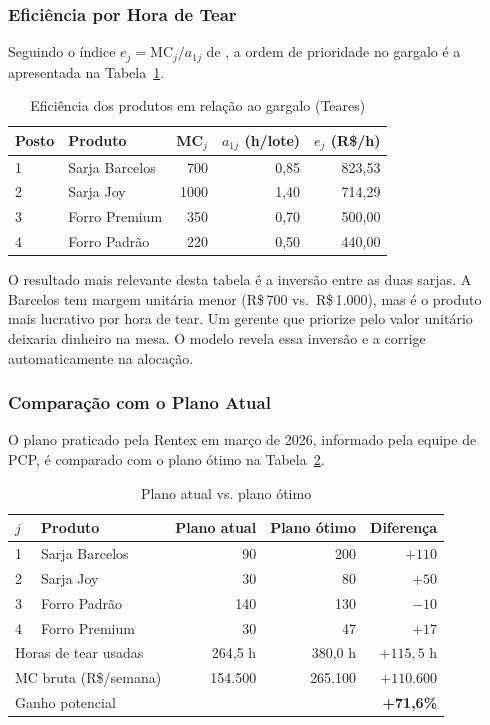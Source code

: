 \subsubsection{Eficiência por Hora de Tear}

Seguindo o índice $e_j = \mathrm{MC}_j / a_{1j}$ de \textcite{sobreiro2013},
a ordem de prioridade no gargalo é a apresentada na Tabela~\ref{tab:efic}.

\begin{table}[H]
\centering
\caption{Eficiência dos produtos em relação ao gargalo (Teares)}
\label{tab:efic}
\begin{tabular}{llrrr}
\toprule
\textbf{Posto} & \textbf{Produto} & \textbf{MC$_j$} & \textbf{$a_{1j}$ (h/lote)} & \textbf{$e_j$ (R\$/h)} \\
\midrule
1 & Sarja Barcelos  &  700 & 0,85 & 823,53 \\
2 & Sarja Joy       & 1000 & 1,40 & 714,29 \\
3 & Forro Premium   &  350 & 0,70 & 500,00 \\
4 & Forro Padrão    &  220 & 0,50 & 440,00 \\
\bottomrule
\end{tabular}
\end{table}

O resultado mais relevante desta tabela é a inversão entre as duas sarjas.
A Barcelos tem margem unitária menor (R\$\,700 vs.\ R\$\,1.000), mas é o
produto mais lucrativo por hora de tear. Um gerente que priorize pelo valor
unitário deixaria dinheiro na mesa. O modelo revela essa inversão e a corrige
automaticamente na alocação.

\subsubsection{Comparação com o Plano Atual}

O plano praticado pela Rentex em março de 2026, informado pela equipe de PCP,
é comparado com o plano ótimo na Tabela~\ref{tab:comp_planos}.

\begin{table}[H]
\centering
\caption{Plano atual vs. plano ótimo}
\label{tab:comp_planos}
\begin{tabular}{llrrr}
\toprule
\textbf{$j$} & \textbf{Produto} & \textbf{Plano atual} & \textbf{Plano ótimo} & \textbf{Diferença} \\
\midrule
1 & Sarja Barcelos  &  90 & 200 & $+110$ \\
2 & Sarja Joy       &  30 &  80 & $+50$  \\
3 & Forro Padrão    & 140 & 130 & $-10$  \\
4 & Forro Premium   &  30 &  47 & $+17$  \\
\midrule
\multicolumn{2}{l}{Horas de tear usadas}  & 264,5 h & 380,0 h & $+115,5$ h \\
\multicolumn{2}{l}{MC bruta (R\$/semana)} & 154.500 & 265.100 & $+110.600$ \\
\multicolumn{2}{l}{Ganho potencial}       &         &         & \textbf{+71,6\%} \\
\bottomrule
\end{tabular}
\end{table}

